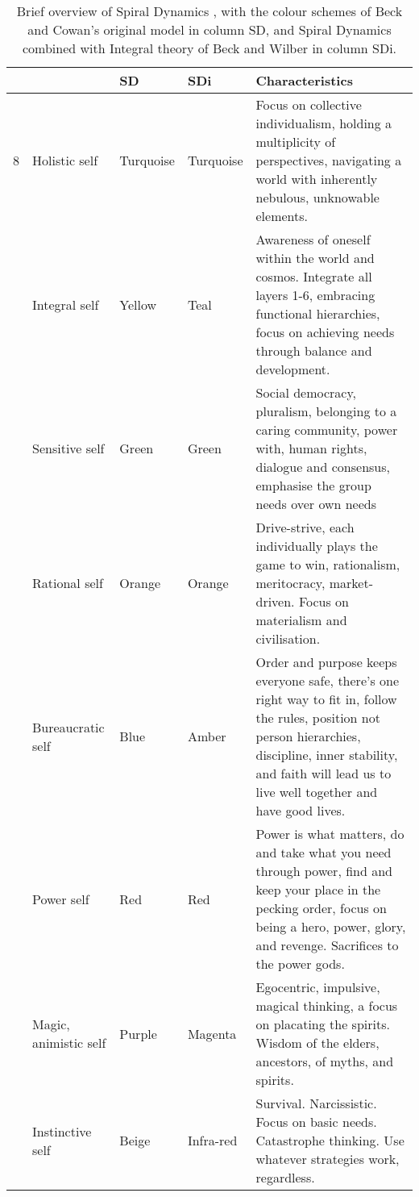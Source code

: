 \begin{table}[htbp]
        \footnotesize
        \begin{tabular}{ R{0.02\textwidth} L{0.15\textwidth}  p{0.12\textwidth}  p{0.12\textwidth}  L{0.40\textwidth} }
                \toprule
                \centering  &    &    SD & SDi & Characteristics \\ 
                \midrule
                {\large 8} & Holistic self & Turquoise & Turquoise & Focus on collective individualism, holding a multiplicity of perspectives, navigating a world with inherently nebulous, unknowable elements.\\
                 & Integral self & Yellow & Teal & Awareness of oneself within the world and cosmos. Integrate all layers 1-6, embracing functional hierarchies, focus on achieving needs through balance and development. \\
                 & Sensitive self & Green & Green & Social democracy, pluralism, belonging to a caring community, power with, human rights, dialogue and consensus, emphasise the group needs over own needs\\
                & Rational self & Orange & Orange & Drive-strive, each individually plays the game to win, rationalism, meritocracy, market-driven. Focus on materialism and civilisation.\\
                & Bureaucratic self & Blue & Amber & Order and purpose keeps everyone safe, there’s one right way to fit in, follow the rules, position not person hierarchies, discipline, inner stability, and faith will lead us to live well together and have good lives.\\
                & Power self & Red & Red & Power is what matters, do and take what you need through power, find and keep your place in the pecking order, focus on being a hero, power, glory, and revenge. Sacrifices to the power gods. \\
                & Magic, animistic self & Purple & Magenta & Egocentric, impulsive, magical thinking, a focus on placating the spirits. Wisdom of the elders, ancestors, of myths, and spirits. \\
                & Instinctive self & Beige & Infra-red & Survival. Narcissistic. Focus on basic needs. Catastrophe thinking. Use whatever strategies work, regardless.\\
                \bottomrule
        \end{tabular} 
        \caption[Overview of Spiral Dynamics]{ Brief overview of Spiral Dynamics , with the colour schemes of Beck and Cowan’s original model in column SD, and Spiral Dynamics combined with Integral theory of Beck and Wilber in column SDi. }
        \label{table:SDi}
\end{table}



